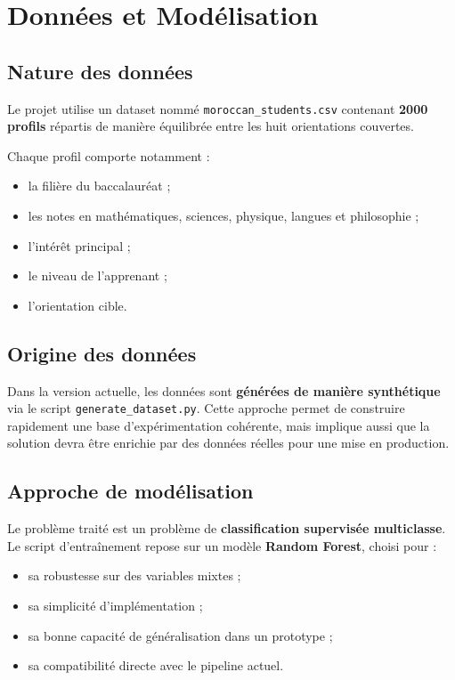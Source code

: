 \documentclass[12pt,a4paper]{report}
\begin{document}
\chapter{Données et Modélisation}

\section{Nature des données}
Le projet utilise un dataset nommé \texttt{moroccan\_students.csv} contenant \textbf{2000 profils} répartis de manière équilibrée entre les huit orientations couvertes.

Chaque profil comporte notamment :
\begin{itemize}[label=--]
    \item la filière du baccalauréat ;
    \item les notes en mathématiques, sciences, physique, langues et philosophie ;
    \item l'intérêt principal ;
    \item le niveau de l'apprenant ;
    \item l'orientation cible.
\end{itemize}

\section{Origine des données}
Dans la version actuelle, les données sont \textbf{générées de manière synthétique} via le script \texttt{generate\_dataset.py}. Cette approche permet de construire rapidement une base d'expérimentation cohérente, mais implique aussi que la solution devra être enrichie par des données réelles pour une mise en production.

\section{Approche de modélisation}
Le problème traité est un problème de \textbf{classification supervisée multiclasse}. Le script d'entraînement repose sur un modèle \textbf{Random Forest}, choisi pour :
\begin{itemize}[label=--]
    \item sa robustesse sur des variables mixtes ;
    \item sa simplicité d'implémentation ;
    \item sa bonne capacité de généralisation dans un prototype ;
    \item sa compatibilité directe avec le pipeline actuel.
\end{itemize}
\end{document}
